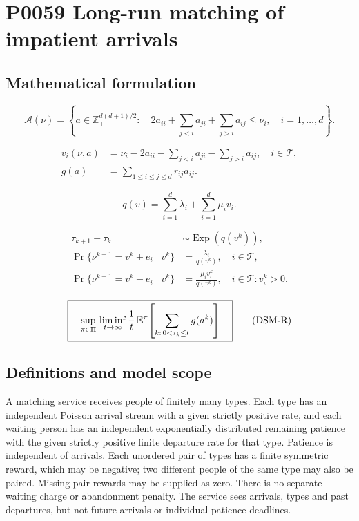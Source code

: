 \documentclass[10pt]{article}
\begin{document}
\section*{P0059 Long-run matching of impatient arrivals}
\subsection*{Mathematical formulation}
\begin{equation}
\mathcal A(\nu)=\left\{a\in\mathbb Z_+^{d(d+1)/2}:\quad
2a_{ii}+\sum_{j<i}a_{ji}+\sum_{j>i}a_{ij}\le\nu_i,
\quad i=1,\ldots,d\right\}.\tag{A}
\end{equation}

\begin{align}
v_i(\nu,a)&=\nu_i-2a_{ii}-\sum_{j<i}a_{ji}-\sum_{j>i}a_{ij},\quad i\in\mathcal T,\tag{S}\\
g(a)&=\sum_{1\le i\le j\le d}r_{ij}a_{ij}.\tag{R}
\end{align}

\[
q(v)=\sum_{i=1}^d\lambda_i+\sum_{i=1}^d\mu_i v_i.
\]

\begin{align}
\tau_{k+1}-\tau_k&\sim\operatorname{Exp}(q(v^k)),\tag{T1}\\
\Pr\{\nu^{k+1}=v^k+e_i\mid v^k\}&=\frac{\lambda_i}{q(v^k)},\quad i\in\mathcal T,\tag{T2}\\
\Pr\{\nu^{k+1}=v^k-e_i\mid v^k\}&=\frac{\mu_i v_i^k}{q(v^k)},\quad i\in\mathcal T:v_i^k>0.\tag{T3}
\end{align}

\begin{equation}
\boxed{\quad\sup_{\pi\in\Pi}\space{}
\liminf_{t\to\infty}\frac1t\,
\mathbb E^{\pi}\!\left[
\sum_{k:\,0<\tau_k\le t}g(a^k)
\right]\quad}\tag{DSM-R}
\end{equation}

\subsection*{Definitions and model scope}
A matching service receives people of finitely many types. Each type has an independent Poisson arrival stream with a given strictly positive rate, and each waiting person has an independent exponentially distributed remaining patience with the given strictly positive finite departure rate for that type. Patience is independent of arrivals. Each unordered pair of types has a finite symmetric reward, which may be negative; two different people of the same type may also be paired. Missing pair rewards may be supplied as zero. There is no separate waiting charge or abandonment penalty. The service sees arrivals, types and past departures, but not future arrivals or individual patience deadlines.
\end{document}
